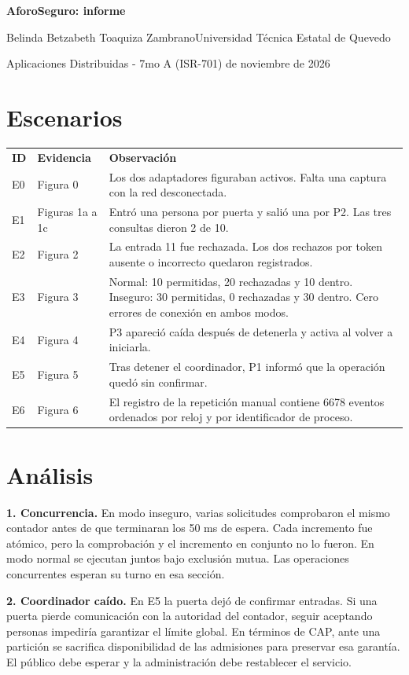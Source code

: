\documentclass[11pt]{article}
\begin{document}
{\Large\textbf{AforoSeguro: informe}}\par
Belinda Betzabeth Toaquiza Zambrano\quad Universidad Técnica Estatal de Quevedo\par
Aplicaciones Distribuidas - 7mo A (ISR-701)  de noviembre de 2026

\section*{Escenarios}
\renewcommand{\arraystretch}{1.2}
\begin{tabular}{@{}p{9mm}p{22mm}p{\dimexpr\linewidth-31mm-4\tabcolsep\relax}@{}}
\textbf{ID} & \textbf{Evidencia} & \textbf{Observación} \\
E0 & Figura 0 & Los dos adaptadores figuraban activos. Falta una captura con la red desconectada. \\
E1 & Figuras 1a a 1c & Entró una persona por puerta y salió una por P2. Las tres consultas dieron 2 de 10. \\
E2 & Figura 2 & La entrada 11 fue rechazada. Los dos rechazos por token ausente o incorrecto quedaron registrados. \\
E3 & Figura 3 & Normal: 10 permitidas, 20 rechazadas y 10 dentro. Inseguro: 30 permitidas, 0 rechazadas y 30 dentro. Cero errores de conexión en ambos modos. \\
E4 & Figura 4 & P3 apareció caída después de detenerla y activa al volver a iniciarla. \\
E5 & Figura 5 & Tras detener el coordinador, P1 informó que la operación quedó sin confirmar. \\
E6 & Figura 6 & El registro de la repetición manual contiene 6678 eventos ordenados por reloj y por identificador de proceso. \\
\end{tabular}

\section*{Análisis}
\textbf{1. Concurrencia.} En modo inseguro, varias solicitudes comprobaron el mismo contador antes de que terminaran los 50 ms de espera. Cada incremento fue atómico, pero la comprobación y el incremento en conjunto no lo fueron. En modo normal se ejecutan juntos bajo exclusión mutua. Las operaciones concurrentes esperan su turno en esa sección.

\textbf{2. Coordinador caído.} En E5 la puerta dejó de confirmar entradas. Si una puerta pierde comunicación con la autoridad del contador, seguir aceptando personas impediría garantizar el límite global. En términos de CAP, ante una partición se sacrifica disponibilidad de las admisiones para preservar esa garantía. El público debe esperar y la administración debe restablecer el servicio.
\end{document}
